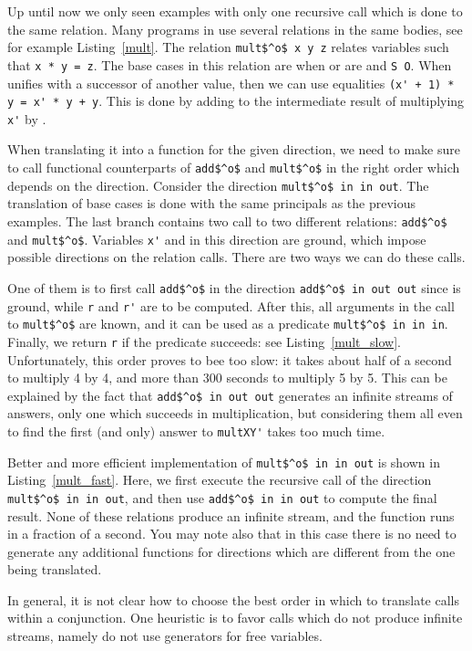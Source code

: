 




Up until now we only seen examples with only one recursive call which is done to the same relation.
Many programs in \mk use several relations in the same bodies, see for example Listing~\ref{mult}.
The relation \lstinline{mult$^o$ x y z} relates variables such that \lstinline{x * y = z}.
The base cases in this relation are when \x or \y are \zero and \lstinline{S O}.
When \x unifies with a successor of another value, then we can use equalities \lstinline{(x' + 1) * y = x' * y + y}.
This is done by adding \y to the intermediate result of multiplying \lstinline{x'} by \y.

When translating it into a function for the given direction, we need to make sure to call functional counterparts of \lstinline{add$^o$} and \lstinline{mult$^o$} in the right order which depends on the direction.
Consider the direction \lstinline{mult$^o$ in in out}.
The translation of base cases is done with the same principals as the previous examples.
The last \conde branch contains two call to two different relations: \lstinline{add$^o$} and \lstinline{mult$^o$}.
Variables \lstinline{x'} and \y in this direction are ground, which impose possible directions on the relation calls.
There are two ways we can do these calls.

One of them is to first call \lstinline{add$^o$} in the direction \lstinline{add$^o$ in out out} since \y is ground, while \lstinline{r} and \lstinline{r'} are to be computed.
After this, all arguments in the call to \lstinline{mult$^o$} are known, and it can be used as a predicate \lstinline{mult$^o$ in in in}.
Finally, we return \lstinline{r} if the predicate succeeds: see Listing~\ref{mult_slow}.
Unfortunately, this order proves to bee too slow: it takes about half of a second to multiply 4 by 4, and more than 300 seconds to multiply 5 by 5.
This can be explained by the fact that \lstinline{add$^o$ in out out} generates an infinite streams of answers, only one which succeeds in multiplication, but considering them all even to find the first (and only) answer to \lstinline{multXY'} takes too much time.

Better and more efficient implementation of \lstinline{mult$^o$ in in out} is shown in Listing~\ref{mult_fast}.
Here, we first execute the recursive call of the direction \lstinline{mult$^o$ in in out}, and then use \lstinline{add$^o$ in in out} to compute the final result.
None of these relations produce an infinite stream, and the function runs in a fraction of a second.
You may note also that in this case there is no need to generate any additional functions for directions which are different from the one being translated.

In general, it is not clear how to choose the best order in which to translate calls within a conjunction.
One heuristic is to favor calls which do not produce infinite streams, namely do not use generators for free variables.

